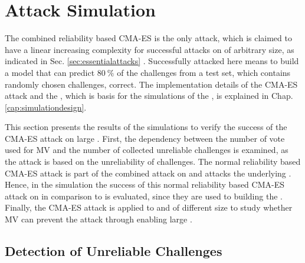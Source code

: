 \chapter{Attack Simulation}
\label{cap:attacksimulations}

The combined reliability based \ac{CMA-ES} is the only attack, which is claimed to have a linear increasing complexity for successful attacks on \xpufs of arbitrary size, as indicated in Sec. \ref{sec:essentialattacks} \cite{Becker2015ThePUFs}.
Successfully attacked here means to build a model that can predict $80\ \%$ of the challenges from a test set, which contains randomly chosen challenges, correct.
The implementation details of the \ac{CMA-ES} attack and the \apuf, which is basis for the simulations of the \mpuf, is explained in Chap. \ref{cap:simulationdesign}.

This section presents the results of the simulations to verify the success of the \ac{CMA-ES} attack on large \xpufs.
First, the dependency between the number of vote used for \ac{MV} and the number of collected unreliable challenges is examined, as the attack is based on the unreliability of challenges.
The normal reliability based \ac{CMA-ES} attack is part of the combined attack on \mxpufs and attacks the underlying \mpufs.
Hence, in the simulation the success of this normal reliability based \ac{CMA-ES} attack on \mpufs in comparison to \apufs is evaluated, since they are used to building the \mxpuf.
Finally, the \ac{CMA-ES} attack is applied to \xpufs and \mxpufs of different size to study whether \ac{MV} can prevent the attack through enabling large \mxpufs. 


\section{Detection of Unreliable Challenges}
\label{sec:detectionofunreliablechallenges}

